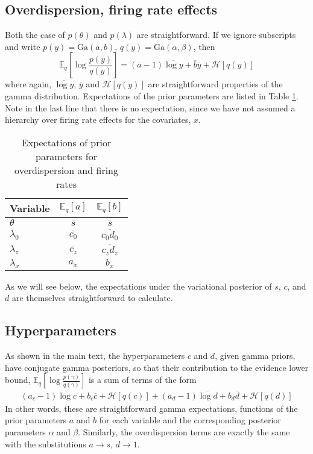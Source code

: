 \documentclass{article} %
\begin{document}
\subsection{Overdispersion, firing rate effects}
Both the case of $p(\theta)$ and $p(\lambda)$ are straightforward. If we ignore subscripts and write $p(y) = \text{Ga}(a, b)$, $q(y) = \text{Ga}(\alpha, \beta)$, then
\begin{equation}
    \mathbb{E}_q \left[\log \frac{p(y)}{q(y)} \right] = 
    (\overline{a} - 1) \overline{\log y} + \overline{b} \overline{y} + \mathcal{H}[q(y)]
\end{equation}
where again, $\overline{\log y}$, $\overline{y}$ and $\mathcal{H}[q(y)]$ are straightforward properties of the gamma distribution. Expectations of the prior parameters are listed in Table \ref{expectation_table}. Note in the last line that there is no expectation, since we have not assumed a hierarchy over firing rate effects for the covariates, $x$.
\begin{table}[ht]
\caption{Expectations of prior parameters for overdispersion and firing rates}
\label{expectation_table}
\begin{center}
\begin{tabular}{lcc}
\multicolumn{1}{c}{\bf Variable}  &\multicolumn{1}{c}{\bf $\mathbb{E}_q[a]$} &\multicolumn{1}{c}{\bf $\mathbb{E}_q[b]$}
\\ \hline 
$\theta$ &$\overline{s}$ &$\overline{s}$ \\
$\lambda_0$ &$\overline{c_0}$ &$\overline{c_0 d_0}$ \\
$\lambda_z$ &$\overline{c_z}$ &$\overline{c_z d_z}$ \\
$\lambda_x$ &$a_x$ &$b_x$ \\
\end{tabular}
\end{center}
\end{table}
As we will see below, the expectations under the variational posterior of $s$, $c$, and $d$ are themselves straightforward to calculate.

\subsection{Hyperparameters}
As shown in the main text, the hyperparameters $c$ and $d$, given gamma priors, have conjugate gamma posteriors, so that their contribution to the evidence lower bound, $\mathbb{E}_q \left[\log \frac{p(\gamma)}{q(\gamma)} \right]$ is a sum of terms of the form
\begin{align}
    (a_{c} - 1) \overline{\log c} + b_{c} \overline{c} + \mathcal{H}[q(c)] + 
    (a_{d} - 1) \overline{\log d} + b_{d} \overline{d} + \mathcal{H}[q(d)] 
\end{align}
In other words, these are straightforward gamma expectations, functions of the prior parameters $a$ and $b$ for each variable and the corresponding posterior parameters $\alpha$ and $\beta$. Similarly, the overdispersion terms are exactly the same with the substitutions $a \rightarrow s$, $d\rightarrow 1$.
\end{document}
